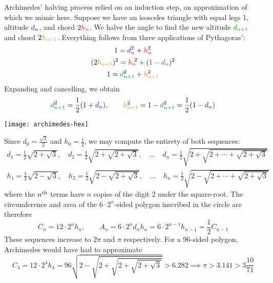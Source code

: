 \begin{minipage}[t]{0.64\linewidth}\vspace{-5pt}
	Archimedes' halving process relied on an induction step, an approximation of which we mimic here. Suppose we have an isosceles triangle with equal legs 1, altitude $\textcolor{blue}{d_n}$, and chord $2\textcolor{red}{h_n}$. We halve the angle to find the new altitude $\textcolor{Green}{d_{n+1}}$ and chord $2\textcolor{orange}{h_{n+1}}$. Everything follows from three applications of Pythagoras':
	\begin{gather*}
		1=\textcolor{blue}{d}^2_{\textcolor{blue}{n}} +\textcolor{red}{h}^2_{\textcolor{red}{n}}\\
		(2\textcolor{orange}{h_{n+1}})^2=\textcolor{red}{h_n}\!\!\!\!\!{\phantom{h}}^2 +(\textcolor{Brown}{1-d_n})^2\\ 
		1=\textcolor{Green}{d}^2_{\textcolor{Green}{n+1}} +\textcolor{orange}{h}^2_{\textcolor{orange}{n+1}}
	\end{gather*}
	Expanding and cancelling, we obtain
	\[
		\textcolor{Green}{d}^2_{\textcolor{Green}{n+1}} =\frac 12(1+\textcolor{blue}{d}_{\textcolor{blue}{n}}),\qquad \textcolor{orange}{h}^2_{\textcolor{orange}{n+1}} =1-\textcolor{Green}{d}^2_{\textcolor{Green}{n+1}} =\frac 12(1-\textcolor{blue}{d}_{\textcolor{blue}{n}})
	\]
\end{minipage}
\hfill
\begin{minipage}[t]{0.35\linewidth}\vspace{0pt}
	\flushright
	\texttt{[image: archimedes-hex]}
\end{minipage}
\medbreak
Since $d_0=\frac{\sqrt 3}2$ and $h_0=\frac 12$, we may compute the entirety of both sequences:
\begin{gather*}
	d_1=\frac 12\sqrt{2+\sqrt 3},\quad d_2=\frac 12\sqrt{2+\sqrt{2+\sqrt 3}},\quad\ldots\quad d_n=\frac 12\sqrt{2+\sqrt{2+\cdots+\sqrt{2+\sqrt 3}}}\\
	h_1=\frac 12\sqrt{2-\sqrt 3},\quad h_2=\frac 12\sqrt{2-\sqrt{2+\sqrt 3}},\quad\ldots\quad h_n=\frac 12\sqrt{2-\sqrt{2+\cdots+\sqrt{2+\sqrt 3}}}
\end{gather*}
where the $n\textsuperscript{th}$ terms have $n$ copies of the digit 2 under the square-root. The circumference and area of the $6\cdot 2^n$-sided polygon inscribed in the circle are therefore
\[
	C_n=12\cdot 2^nh_n,\qquad A_n=6\cdot 2^nd_nh_n=6\cdot 2^{n-1}h_{n-1}=\frac 12C_{n-1}
\]
These sequences increase to $2\pi$ and $\pi$ respectively. For a 96-sided polygon, Archimedes would have had to approximate
\[
	C_4=12\cdot 2^4h_4=96\sqrt{2-\sqrt{2+\sqrt{2+\sqrt{2+\sqrt 3}}}}> 6.282\implies \pi>3.141>3\frac{10}{71}
\]




